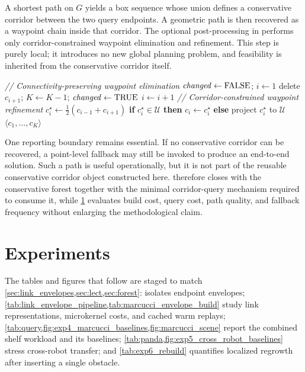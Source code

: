 \documentclass[journal]{IEEEtran}
\DeclareRobustCommand{\textsc}[1]{\textnormal{\MakeUppercase{#1}}}
\begin{document}
A shortest path on $G$ yields a box sequence whose union defines a conservative
corridor between the two query endpoints. A geometric path is then recovered as
a waypoint chain inside that corridor. The optional post-processing in
 performs only corridor-constrained waypoint
elimination and refinement. This step is purely local; it introduces no new
global planning problem, and feasibility is inherited from the conservative
corridor itself.

\begin{algorithm}[t]
\caption{\textsc{PathOpt}---corridor-preserving waypoint cleanup and midpoint polish}
\label{alg:pathopt_rewrite}
\footnotesize
\begin{algorithmic}[1]
\STATE \textit{// Connectivity-preserving waypoint elimination}
\REPEAT
  \STATE $\mathit{changed} \gets \textsc{false}$; $i \gets 1$
      \STATE delete $c_{i+1}$; $K \gets K-1$; $\mathit{changed} \gets \textsc{true}$
    \ELSE
      \STATE $i \gets i+1$
    \ENDIF
  \ENDWHILE
{}
\STATE \textit{// Corridor-constrained waypoint refinement}
  \STATE $c_i^\star \gets \tfrac{1}{2}(c_{i-1}+c_{i+1})$
  \STATE \textbf{if} $c_i^\star \in \mathcal{U}$ \textbf{then} $c_i \gets c_i^\star$
  \STATE \textbf{else} project $c_i^\star$ to $\mathcal{U}$
\ENDFOR
\STATE \RETURN $\langle c_1,\dots,c_K\rangle$
\end{algorithmic}
\end{algorithm}

One reporting boundary remains essential. If no conservative corridor can be
recovered, a point-level fallback may still be invoked to produce an end-to-end
solution. Such a path is useful operationally, but it is not part of the
reusable conservative corridor object constructed here.  therefore closes
with the conservative forest together with the minimal corridor-query mechanism
required to consume it, while \cref{sec:exp} evaluates build cost, query
cost, path quality, and fallback frequency without enlarging the
methodological claim.

\section{Experiments}\label{sec:exp}

The tables and figures that follow are staged to match \cref{sec:link_envelopes,sec:lect,sec:forest}:
 isolates endpoint envelopes; \cref{tab:link_envelope_pipeline,tab:marcucci_envelope_build} study link representations, microkernel costs, and cached warm replays; \cref{tab:query,fig:exp4_marcucci_baselines,fig:marcucci_scene} report the combined shelf workload and its baselines; \cref{tab:panda,fig:exp5_cross_robot_baselines} stress cross-robot transfer; and \cref{tab:exp6_rebuild} quantifies localized regrowth after inserting a single obstacle.
\end{document}
